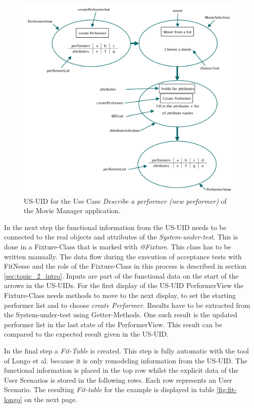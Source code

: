 \begin{figure}[H]
	\centering
	\includegraphics[width=.85\textwidth]{../images/US-UID.png}
	\caption{US-UID for the Use Case \textit{Describe a performer (new performer)} of the Movie Manager application.}
	\label{fig:us-uid-mm}
\end{figure}

In the next step the functional information from the US-UID needs to be connected to the real
objects and attributes of the \textit{System-under-test}. This is done in a Fixture-Class that is marked
with \textit{@Fixture}.
This class has to be written manually.
The data flow during the execution of acceptance tests with FitNesse and the role of the Fixture-Class in this process is described in section \ref{sec:topic_2_intro}.
Inputs are part of the functional data on the start of the arrows in the US-UIDs. 
For the first display of the US-UID PerformerView the Fixture-Class needs methods to move to the next display, to set the starting performer list and to choose
\textit{create Performer}.
Results have to be extracted from the System-under-test using Getter-Methods.
One such result is the updated performer list in the last state of the PerformerView.
This result can be compared to the expected result given in the US-UID.

In the final step a \textit{Fit-Table} is created.
This step is fully automatic with the tool of Longo et al. because it is only remodeling information from the US-UID.
The functional information is placed in the top row whilst the explicit data of the User Scenarios is stored in the following rows.
Each row represents an User Scenario.
The resulting \textit{Fit-table} for the example is displayed in table \ref{fig:fit-longo} on the next page.

